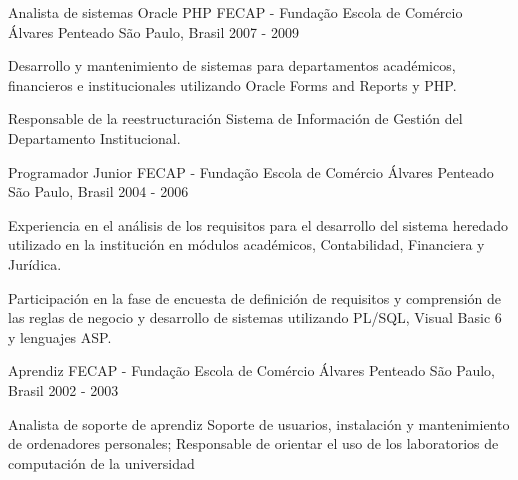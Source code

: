 \begin{cventries}
  \cventry
    {Analista de sistemas Oracle PHP} %
    {FECAP - Fundação Escola de Comércio Álvares Penteado} %
    {São Paulo, Brasil} %
    {2007 - 2009} %
    {
      \begin{cvitems} %
        \item {Desarrollo y mantenimiento de sistemas para departamentos académicos, financieros e institucionales utilizando Oracle Forms and Reports y PHP.}
       \item{Responsable de la reestructuración Sistema de Información de Gestión del Departamento Institucional.}
      \end{cvitems}
    }

  \cventry
    {Programador Junior} %
    {FECAP - Fundação Escola de Comércio Álvares Penteado} %
    {São Paulo, Brasil} %
    {2004 - 2006} %
    {
      \begin{cvitems} %
        \item {Experiencia en el análisis de los requisitos para el desarrollo del sistema heredado utilizado en la institución en módulos académicos, Contabilidad, Financiera y Jurídica.}
        \item {Participación en la fase de encuesta de definición de requisitos y comprensión de las reglas de negocio y desarrollo de sistemas utilizando PL/SQL, Visual Basic 6 y lenguajes ASP.}
      \end{cvitems}
    }

  \cventry
    {Aprendiz} %
    {FECAP - Fundação Escola de Comércio Álvares Penteado} %
    {São Paulo, Brasil} %
    {2002 - 2003} %
    {
      \begin{cvitems} %
        \item {Analista de soporte de aprendiz
Soporte de usuarios, instalación y mantenimiento de ordenadores personales;
Responsable de orientar el uso de los laboratorios de computación de la universidad}
      \end{cvitems}
    }

\end{cventries}
